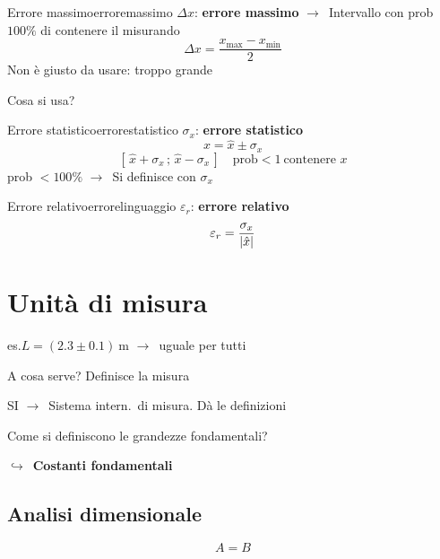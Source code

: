 \documentclass[11pt,a4paper,oneside]{book}
\newcommand{\grigio}[1]{{\color{grigio}#1}}
\newcommand{\fr}{\ensuremath{\rightarrow}}
\newcommand{\giu}{\ensuremath{\hookrightarrow}}
\newcommand{\chiave}[1]{\textbf{#1}}
\DeclarePairedDelimiter{\abs}{\lvert}{\rvert}
\begin{document}
\begin{definizione}{Errore massimo}{erroremassimo}
$\Delta x$: \chiave{errore massimo} \fr\ Intervallo con prob $100\%$ di contenere il misurando
\[
  \Delta x = \frac{x_{\max} - x_{\min}}{2}
\]
\grigio{Non è giusto da usare: troppo grande}
\end{definizione}

Cosa si usa?

\begin{definizione}
{Errore statistico}{errorestatistico}
$\sigma_x$: \chiave{errore statistico}
\[
  x = \hat{x} \pm \sigma_x
\]
\[
  [\,\hat{x} + \sigma_x \,;\, \hat{x} - \sigma_x\,] \quad \text{prob} < 1 \ \text{contenere } x
\]
prob $< 100\%$ \fr\ Si definisce con $\sigma_x$
\end{definizione}

\begin{definizione}
{Errore relativo}{errorelinguaggio}
$\varepsilon_r$: \chiave{errore relativo}
\[
  \varepsilon_r = \frac{\sigma_x}{\abs{\hat{x}}}
\]
\end{definizione}

\newpage
\section{Unità di misura}

es.\quad $L = (2.3 \pm 0.1)\ \mathrm{m}$ \fr\ uguale per tutti

\begin{spunto}
A cosa serve? Definisce la misura
\end{spunto}

SI \fr\ Sistema intern.\ di misura. Dà le definizioni

\begin{attenzione}
Come si definiscono le grandezze fondamentali?

\giu\ \chiave{Costanti fondamentali}
\end{attenzione}

\subsection*{Analisi dimensionale}
\[
  A = B
\]
\end{document}
